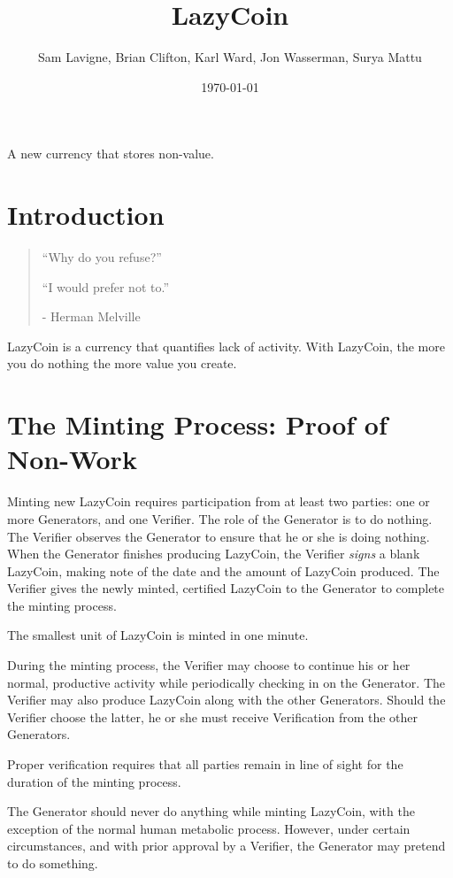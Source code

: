 \documentclass[a4paper]{article}
\title{LazyCoin}
\author{Sam Lavigne, Brian Clifton, Karl Ward, Jon Wasserman, Surya Mattu}
\date{\today}
\begin{document}
\maketitle

\abstract
A new currency that stores non-value.


\section{Introduction}

\begin{quote}
``Why do you refuse?''

``I would prefer not to.''

- Herman Melville
\end{quote}


LazyCoin is a currency that quantifies lack of activity. With LazyCoin, the more you do nothing the more value you create. 


\section{The Minting Process: Proof of Non-Work}

Minting new LazyCoin requires participation from at least two parties: one or more Generators, and one Verifier. The role of the Generator is to do nothing. The Verifier observes the Generator to ensure that he or she is doing nothing. When the Generator finishes producing LazyCoin, the Verifier \textit{signs} a blank LazyCoin, making note of the date and the amount of LazyCoin produced. The Verifier gives the newly minted, certified LazyCoin to the Generator to complete the minting process. 

The smallest unit of LazyCoin is minted in one minute.

During the minting process, the Verifier may choose to continue his or her normal, productive activity while periodically checking in on the Generator. The Verifier may also produce LazyCoin along with the other Generators. Should the Verifier choose the latter, he or she must receive Verification from the other Generators.

Proper verification requires that all parties remain in line of sight for the duration of the minting process.

The Generator should never do anything while minting LazyCoin, with the exception of the normal human metabolic process. However, under certain circumstances, and with prior approval by a Verifier, the Generator may pretend to do something.
\end{document}
